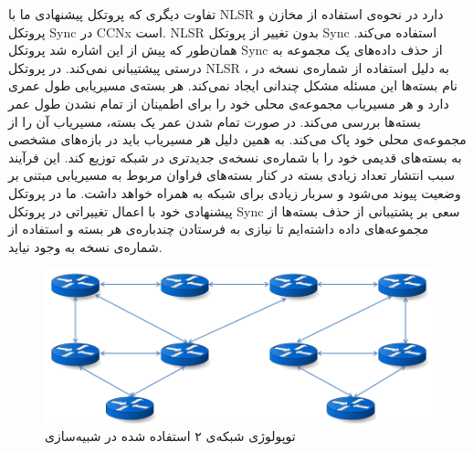 تفاوت دیگری که پروتکل پیشنهادی ما با NLSR دارد در نحوه‌ی استفاده از مخازن و پروتکل Sync در CCNx است. NLSR بدون تغییر از پروتکل Sync استفاده می‌کند. همان‌طور که پیش از این اشاره شد پروتکل Sync از حذف داده‌های یک مجموعه به درستی پیشتیبانی نمی‌کند. در پروتکل NLSR ، به دلیل استفاده از شماره‌ی نسخه در نام بسته‌ها این مسئله مشکل چندانی ایجاد نمی‌کند. هر بسته‌ی مسیریابی طول عمری دارد و هر مسیریاب مجموعه‌ی محلی خود را برای اطمینان از تمام نشدن طول عمر بسته‌ها بررسی می‌کند. در صورت تمام شدن عمر یک بسته، مسیریاب آن را از مجموعه‌ی محلی خود پاک می‌کند. به همین دلیل هر مسیریاب باید در بازه‌های مشخصی به بسته‌های قدیمی خود را با شماره‌ی نسخه‌ی جدیدتری در شبکه توزیع کند. این فرآیند سبب انتشار تعداد زیادی بسته در کنار بسته‌های فراوان مربوط به مسیریابی مبتنی بر وضعیت پیوند می‌شود و سربار زیادی برای شبکه به همراه خواهد داشت. ما در پروتکل پیشنهادی خود با اعمال تغییراتی در پروتکل Sync سعی بر پشتیبانی از حذف بسته‌ها از مجموعه‌های داده داشته‌ایم تا نیازی به فرستادن چندباره‌ی هر بسته و استفاده از شماره‌ی نسخه به وجود نیاید.

 \begin{figure}[h!]
\centering
\includegraphics[scale=0.6]{./resources/figures/Network2.png}
\caption{توپولوژی شبکه‌ی ۲ استفاده شده در شبیه‌سازی}
\label{fig:Net2}
\end{figure}

